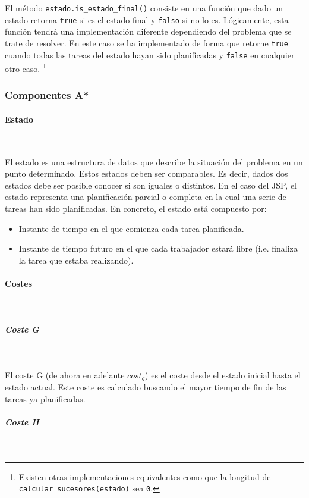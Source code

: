 El método \lstinline{estado.is_estado_final()}
consiste en una función que dado un estado retorna
\lstinline{true} si es el estado final y \lstinline{falso}
si no lo es.
Lógicamente, esta función tendrá una implementación
diferente dependiendo del problema que se trate de resolver.
En este caso se ha implementado de forma que retorne \lstinline{true}
cuando todas las tareas del estado hayan sido planificadas
y \lstinline{false} en cualquier otro caso.
\footnote{Existen otras implementaciones equivalentes como que la longitud de
\lstinline{calcular_sucesores(estado)} sea \lstinline{0}.}

\pagebreak

\subsubsection{Componentes A*}

\paragraph{Estado}~

El estado es una estructura de datos que describe la situación
del problema en un punto determinado.
Estos estados deben ser comparables.
Es decir, dados dos estados debe ser posible conocer si son iguales o distintos.
En el caso del JSP, el estado representa una planificación parcial o completa
en la cual una serie de tareas han sido planificadas.
En concreto, el estado está compuesto por:
\begin{itemize}[itemsep=0.25px]
    \item Instante de tiempo en el que comienza cada tarea planificada.
    \item Instante de tiempo futuro en el que cada trabajador estará libre
    (i.e. finaliza la tarea que estaba realizando).
\end{itemize}

\paragraph{Costes}~

\subparagraph{Coste G}~

El coste G (de ahora en adelante $cost_g$) es el coste desde el estado inicial
hasta el estado actual.
Este coste es calculado buscando el mayor tiempo de fin de
las tareas ya planificadas.

\subparagraph{Coste H}~

